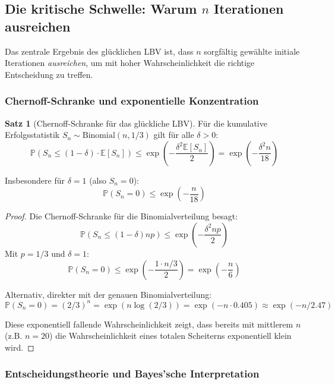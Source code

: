 ﻿\documentclass[a4paper,12pt]{article}
\theoremstyle{definition}
\newtheorem{satz}{Satz}
\begin{document}
\subsection{Die kritische Schwelle: Warum $n$ Iterationen ausreichen}

Das zentrale Ergebnis des glücklichen LBV ist, dass $n$ sorgfältig gewählte initiale Iterationen \emph{ausreichen}, um mit hoher Wahrscheinlichkeit die richtige Entscheidung zu treffen.

\subsubsection{Chernoff-Schranke und exponentielle Konzentration}

\begin{satz}[Chernoff-Schranke für das glückliche LBV]
Für die kumulative Erfolgsstatistik $S_n \sim \text{Binomial}(n, 1/3)$ gilt für alle $\delta > 0$:
\[
\mathbb{P}(S_n \leq (1-\delta) \cdot \mathbb{E}[S_n]) \leq \exp\left(-\frac{\delta^2 \mathbb{E}[S_n]}{2}\right) = \exp\left(-\frac{\delta^2 n}{18}\right)
\]

Insbesondere für $\delta = 1$ (also $S_n = 0$):
\[
\mathbb{P}(S_n = 0) \leq \exp\left(-\frac{n}{18}\right)
\]
\end{satz}

\begin{proof}
Die Chernoff-Schranke für die Binomialverteilung besagt:
\[
\mathbb{P}(S_n \leq (1-\delta) np) \leq \exp\left(-\frac{\delta^2 np}{2}\right)
\]
Mit $p = 1/3$ und $\delta = 1$:
\[
\mathbb{P}(S_n = 0) \leq \exp\left(-\frac{1 \cdot n/3}{2}\right) = \exp\left(-\frac{n}{6}\right)
\]

Alternativ, direkter mit der genauen Binomialverteilung:
\[
\mathbb{P}(S_n = 0) = (2/3)^n = \exp(n \log(2/3)) = \exp(-n \cdot 0.405) \approx \exp(-n/2.47)
\]

Diese exponentiell fallende Wahrscheinlichkeit zeigt, dass bereits mit mittlerem $n$ (z.B. $n = 20$) die Wahrscheinlichkeit eines totalen Scheiterns exponentiell klein wird.
\end{proof}

\subsubsection{Entscheidungstheorie und Bayes'sche Interpretation}
\end{document}

